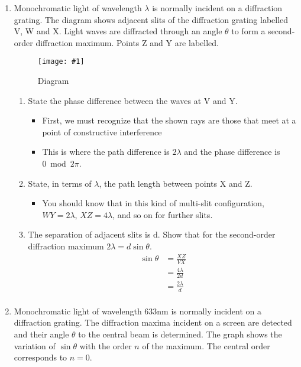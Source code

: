 \documentclass[a4paper,12pt]{article}
\newcommand{\img}[4]{\begin{center}
  \begin{figure}[H]
    \centering
    \texttt{[image: \#1]}
    \caption{#3}
    \label{fig:#4}
  \end{figure}
\end{center}}
\begin{document}
\begin{enumerate}
  \item Monochromatic light of wavelength $\lambda$ is normally incident on a diffraction grating.
        The diagram shows adjacent slits of the diffraction grating labelled V, W and X.
        Light waves are diffracted through an angle $\theta$ to form a second-order diffraction
        maximum. Points Z and Y are labelled.
        \img{ex/7.png}{0.7}{Diagram}{ex7}
        \begin{enumerate}[label=(\roman*)]
          \item State the phase difference between the waves at V and Y.
                \begin{itemize}
                  \item First, we must recognize that the shown rays are those that meet at a point of constructive interference
                  \item This is where the path difference is $2\lambda$ and the phase difference is $0\bmod{2\pi}$.
                \end{itemize}
          \item State, in terms of $\lambda$, the path length between points X and Z.
                \begin{itemize}
                  \item You should know that in this kind of multi-slit configuration, $WY = 2\lambda$, $XZ = 4\lambda$, and so on for further slits.
                \end{itemize}
          \item The separation of adjacent slits is d. Show that for the second-order diffraction maximum $2\lambda = d\sin\theta$.
                \begin{align*}
                  \sin \theta & = \frac{XZ}{VX}       \\
                              & = \frac{4\lambda}{2d} \\
                              & = \frac{2\lambda}{d}  \\
                \end{align*}
        \end{enumerate}
  \item Monochromatic light of wavelength 633nm is normally incident on a diffraction grating. The diffraction maxima incident on a screen are detected and their angle $\theta$ to the central beam is determined. The graph shows the variation of $\sin \theta$ with the order $n$ of the maximum. The central order corresponds to $n=0$.

\end{enumerate}
\end{document}
